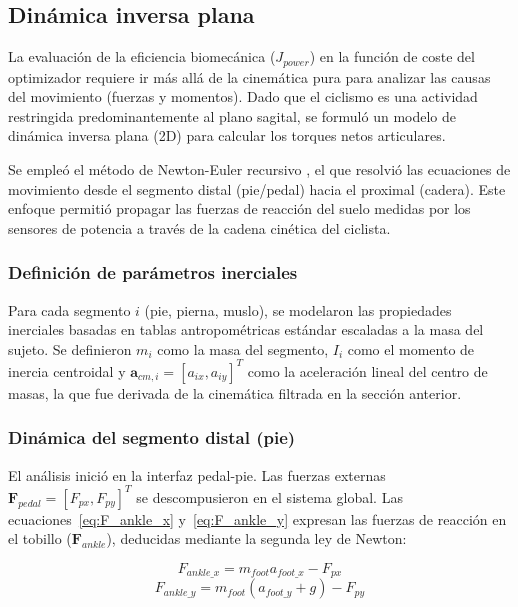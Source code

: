 \subsection{Dinámica inversa plana}
\label{subsec:dinamica_inversa}

La evaluación de la eficiencia biomecánica ($J_{power}$) en la función de coste
del optimizador requiere ir más allá de la cinemática pura para analizar las
causas del movimiento (fuerzas y momentos). Dado que el ciclismo es una
actividad restringida predominantemente al plano sagital, se formuló un modelo
de dinámica inversa plana (2D) para calcular los torques netos articulares.

Se empleó el método de Newton-Euler recursivo \citep{sdycontrol2023newton}, el
que resolvió las ecuaciones de movimiento desde el segmento distal (pie/pedal)
hacia el proximal (cadera). Este enfoque permitió propagar las fuerzas de
reacción del suelo medidas por los sensores de potencia a través de la cadena
cinética del ciclista.

\subsubsection{Definición de parámetros inerciales}
Para cada segmento $i$ (pie, pierna, muslo), se modelaron las propiedades
inerciales basadas en tablas antropométricas estándar escaladas a la masa del
sujeto. Se definieron $m_i$ como la masa del segmento, $I_i$ como el momento de
inercia centroidal y $\mathbf{a}_{cm, i} = [a_{ix}, a_{iy}]^T$ como la
aceleración lineal del centro de masas, la que fue derivada de la cinemática
filtrada en la sección anterior.

\subsubsection{Dinámica del segmento distal (pie)}
El análisis inició en la interfaz pedal-pie. Las fuerzas externas
$\mathbf{F}_{pedal} = [F_{px}, F_{py}]^T$ se descompusieron en el sistema
global. Las ecuaciones~\ref{eq:F_ankle_x} y~\ref{eq:F_ankle_y} expresan las fuerzas de reacción en el tobillo ($\mathbf{F}_{ankle}$), deducidas mediante la segunda ley de Newton:

\begin{equation}
  \label{eq:F_ankle_x}
  F_{ankle\_x} = m_{foot} a_{foot\_x} - F_{px}
\end{equation}
\begin{equation}
  \label{eq:F_ankle_y}
  F_{ankle\_y} = m_{foot} (a_{foot\_y} + g) - F_{py}
\end{equation}

